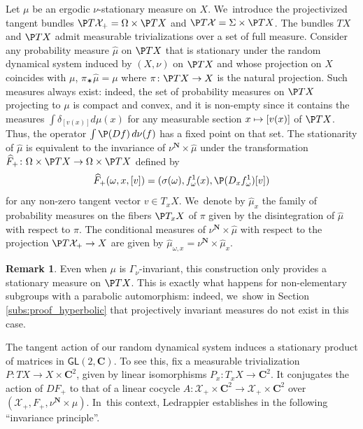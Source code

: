 \documentclass[JEP,XML,SOM,Unicode,published]{cedram}
\newcommand\mto{\mathchoice{\longmapsto}{\mapsto}{\mapsto}{\mapsto}}
\def\C{\mathbf{C}}
\def\N{\mathbf{N}}
\newcommand{\cX}{\mathcal{X}}
\newcommand\GL{{\mathsf{GL}}}
\theoremstyle{plain}
\theoremstyle{definition}
\newtheorem{rem}[thm]{Remark}
\begin{document}
Let $\mu$ be an ergodic $\nu$-stationary measure on $X$. We~introduce the projectivized tangent bundles $\P T \cX_+ = \Omega \times \P TX$ and $\P T\cX = \Sigma\times \P TX$. The bundles $TX$ and $\P TX$ admit measurable trivializations over a set of full measure.
Consider any probability measure $\hat\mu$ on $\P TX$ that is stationary under the random dynamical system induced by $(X,\nu)$ on $\P TX$
and whose projection on $X$ coincides with $\mu$, \ie $\pi_\varstar \hat\mu= \mu $ where $\pi\colon \P TX\to X$ is the natural projection.
Such measures always exist: indeed,
the set of probability measures on $\P TX$ projecting to $\mu$ is compact and convex, and it is non-empty since it contains
the measures $\int \delta_{[v(x)]} d\mu(x)$ for any measurable section
$x\mto [v(x)]$ of $\P TX$. Thus, the operator $\int \P (Df) \,d\nu(f)$ has a fixed point on that set. The stationarity of $\hat\mu$ is equivalent to the invariance of $\nu^\N\times \hat\mu$
under the transformation ${\widehat{F}_+}\colon \Omega\times \P TX\to \Omega\times \P TX$ defined by
\begin{equation*}
{\widehat{F}_+}(\omega, x, [v])= (\sigma(\omega), f^1_\omega(x), \P(D_xf^1_\omega)[v])
\end{equation*}
for any non-zero tangent vector $v\in T_xX$. We~denote by $\hat\mu_x$ the family of probability measures
on the fibers $\P T_x X$ of $\pi$
given by the disintegration of $\hat\mu$ with respect to $\pi$.
The conditional measures of $\nu^\N\times\hat\mu$ with respect to the projection
$\P T\cX_+\to X$ are given by $\hat\mu_{\omega,x} = \nu^\N\times \hat\mu_x$.

\begin{rem}
Even when $\mu$ is $\Gamma_\nu$-invariant, this construction only provides a stationary measure on
$\P TX$. This is exactly what happens for non-elementary subgroups with a parabolic automorphism:
indeed, we~show in Section \ref{subs:proof_hyperbolic} that projectively invariant measures do not exist in this case.
\end{rem}

The tangent action of our random dynamical system induces a stationary product of
matrices in $\GL(2, \C)$. To see this, fix a measurable trivialization $P\colon TX\to X\times \C^2$, given
by linear isomorphisms $P_x\colon T_xX\to \C^2$. It conjugates the action of $DF_+$ to that of a linear
cocycle $A:\cX_+ \times \C^2\to \cX_+ \times \C^2$ over $(\cX_+, F_+, \nu^\N\times \mu)$. In~this context,
Ledrappier establishes in \cite{ledrappier_stationary}
the following ``invariance principle''.
\end{document}

